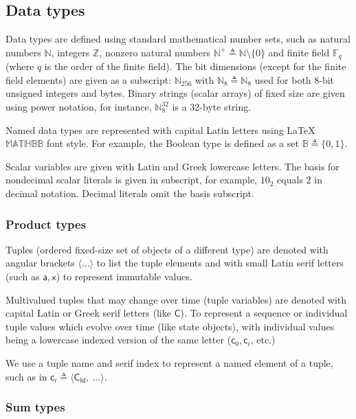 \documentclass[9pt,oneside]{amsart}
\begin{document}
\begin{multicols}{2}
\subsection{Data types}

Data types are defined using standard mathematical number sets, such as
natural numbers $\mathbb{N}$, integers $\mathbb{Z}$,
nonzero natural numbers $\mathbb{N}^+ \triangleq \mathbb{N}\setminus\{0\}$
and finite field $\mathbb{F}_q$ (where $q$ is the order of the finite field).
The bit dimensions (except for the finite field elements) are given as a subscript:
$\mathbb{N}_{256}$ with $\mathbb{N}_8 \triangleq \mathbb{N}_8$ used for both 8-bit
unsigned integers and bytes.
Binary strings (scalar arrays) of fixed size are given using power notation,
for instance, $\mathbb{N}_8^{32}$ is a 32-byte string.

Named data types are represented with capital Latin letters using \LaTeX\ $\mathbb{MATHBB}$ font style.
For example, the Boolean type is defined as a set $\mathbb{B} \triangleq \{0, 1\}$.

Scalar variables are given with Latin and Greek lowercase letters.
The basis for nondecimal scalar literals is given in subscript,
for example, $10_2$ equals $2$ in decimal notation. Decimal literals omit the basis subscript.

\subsubsection{Product types}

Tuples (ordered fixed-size set of objects of a different type) are denoted with angular brackets
$\langle \ldots \rangle$ to list the tuple elements
and with small Latin serif letters (such as $\mathsf{a}, \mathsf{x}$) to represent immutable values.

Multivalued tuples that may change over time (tuple variables) are denoted
with capital Latin or Greek serif letters (like $\mathsf{C}$). To represent
a sequence or individual tuple values which evolve over time (like state objects),
with individual values being a lowercase indexed version of the same letter
($\mathsf{c}_0, \mathsf{c}_i$, etc.)

We use a tuple name and serif index to represent a named element of a tuple,
such as in $\mathsf{c}_i \triangleq \langle \mathsf{C_{Id}}, \ \ldots \rangle$.

\subsubsection{Sum types}


\end{multicols}
\end{document}

